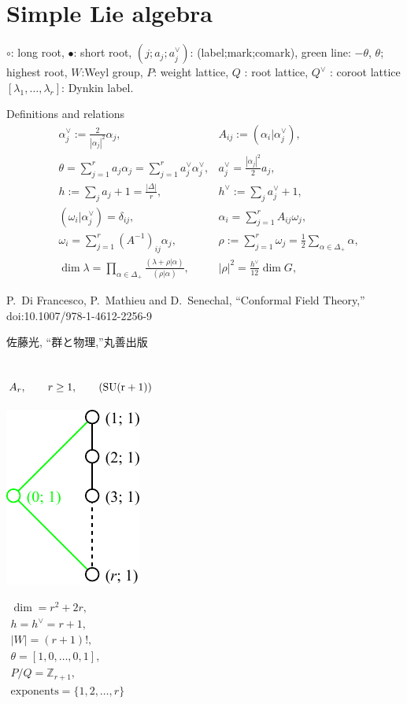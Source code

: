 \documentclass[12pt]{article}
\newcommand{\Zb}{\mathbb{Z}}
\newcommand{\SU}{\rm SU}
\newcommand{\hc}{h^{\vee}}
\newcommand{\alc}{\alpha^{\vee}}
\newcommand{\ac}{a^{\vee}}
\begin{document}
\section*{Simple Lie algebra}
$\circ$: long root, $\bullet$: short root, $(j;a_j;a^{\vee}_j)$:
 (label;mark;comark), green line: $-\theta$,    $\theta$; highest root,
$W$:Weyl group, $P$: weight lattice,
$Q$ : root lattice, $Q^{\vee}$ : coroot lattice
$[\lambda_1,\dots,\lambda_r]$: Dynkin label.

Definitions and relations
\begin{align*}
 &\alc_j:=\frac{2}{|\alpha_j|^2}\alpha_j,
 &A_{ij}:=(\alpha_{i}|\alc_j),\\
 &\theta=\sum_{j=1}^{r}a_{j}\alpha_j=\sum_{j=1}^{r}\ac_j\alc_j,
 &\ac_{j}=\frac{|\alpha_j|^2}{2}a_{j},\\
 &h:=\sum_{j}a_j+1=\frac{|\Delta|}{r},
 &\hc:=\sum_{j}\ac_j+1,\\
 &(\omega_i| \alc_j)=\delta_{ij},
 &\alpha_i=\sum_{j=1}^{r} A_{ij}\omega_j,\\
 &\omega_i=\sum_{j=1}^{r} (A^{-1})_{ij}\alpha_j,
 &\rho:=\sum_{j=1}^{r}\omega_j=\frac12\sum_{\alpha\in\Delta_+}\alpha,\\
 &\dim \lambda =
      \prod_{\alpha\in\Delta_{+}}\frac{(\lambda+\rho|\alpha)}{(\rho|\alpha)},
 &|\rho|^2= \frac{\hc}{12}\dim G,
\end{align*}

\begin{thebibliography}{99}
P.~Di Francesco, P.~Mathieu and D.~Senechal,
``Conformal Field Theory,''
doi:10.1007/978-1-4612-2256-9
\begin{CJK}{UTF8}{ipxm}佐藤光, ``群と物理,''丸善出版\end{CJK}
\end{thebibliography}
\newpage
%
\subsection*{$A_r,\qquad r\ge 1,\qquad (\SU(r+1))$}
\parbox{8cm}{\includegraphics{lie_A.pdf}}
$
\begin{array}{l}
 \dim = r^2+2r, \\
 h=\hc= r+1,\\
 |W|=(r+1)!,\\
 \theta=[1,0,\dots,0,1],\\
 P/Q=\Zb_{r+1},\\
 \text{exponents}={\{1,2,\dots,r\}}
\end{array}
$
\end{document}
